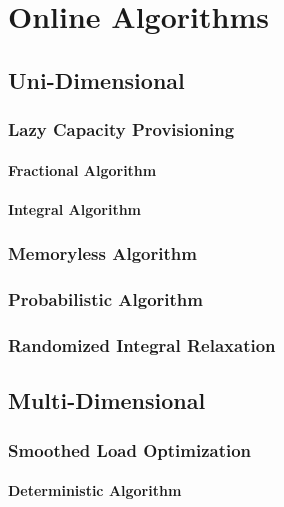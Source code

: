 
\chapter{Online Algorithms}\label{chapter:algorithms}

\section{Uni-Dimensional}

\subsection{Lazy Capacity Provisioning}

\subsubsection{Fractional Algorithm}

\subsubsection{Integral Algorithm}

\subsection{Memoryless Algorithm}

\subsection{Probabilistic Algorithm}

\subsection{Randomized Integral Relaxation}

\section{Multi-Dimensional}

\subsection{Smoothed Load Optimization}

\subsubsection{Deterministic Algorithm}

